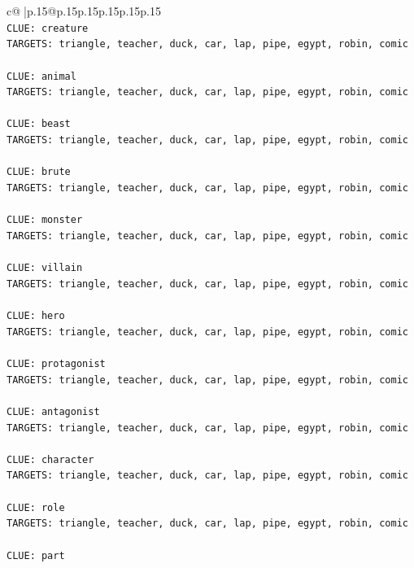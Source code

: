 \documentclass{article}
\begin{document}
{\begin{supertabular}{c@{$\;$}|p{.15\linewidth}@{}p{.15\linewidth}p{.15\linewidth}p{.15\linewidth}p{.15\linewidth}p{.15\linewidth}}
{{{\\ 
\texttt{CLUE: creature} \\
\texttt{TARGETS: triangle, teacher, duck, car, lap, pipe, egypt, robin, comic} \\
\\ 
\texttt{CLUE: animal} \\
\texttt{TARGETS: triangle, teacher, duck, car, lap, pipe, egypt, robin, comic} \\
\\ 
\texttt{CLUE: beast} \\
\texttt{TARGETS: triangle, teacher, duck, car, lap, pipe, egypt, robin, comic} \\
\\ 
\texttt{CLUE: brute} \\
\texttt{TARGETS: triangle, teacher, duck, car, lap, pipe, egypt, robin, comic} \\
\\ 
\texttt{CLUE: monster} \\
\texttt{TARGETS: triangle, teacher, duck, car, lap, pipe, egypt, robin, comic} \\
\\ 
\texttt{CLUE: villain} \\
\texttt{TARGETS: triangle, teacher, duck, car, lap, pipe, egypt, robin, comic} \\
\\ 
\texttt{CLUE: hero} \\
\texttt{TARGETS: triangle, teacher, duck, car, lap, pipe, egypt, robin, comic} \\
\\ 
\texttt{CLUE: protagonist} \\
\texttt{TARGETS: triangle, teacher, duck, car, lap, pipe, egypt, robin, comic} \\
\\ 
\texttt{CLUE: antagonist} \\
\texttt{TARGETS: triangle, teacher, duck, car, lap, pipe, egypt, robin, comic} \\
\\ 
\texttt{CLUE: character} \\
\texttt{TARGETS: triangle, teacher, duck, car, lap, pipe, egypt, robin, comic} \\
\\ 
\texttt{CLUE: role} \\
\texttt{TARGETS: triangle, teacher, duck, car, lap, pipe, egypt, robin, comic} \\
\\ 
\texttt{CLUE: part} \\
}}}
\end{supertabular}}
\end{document}
